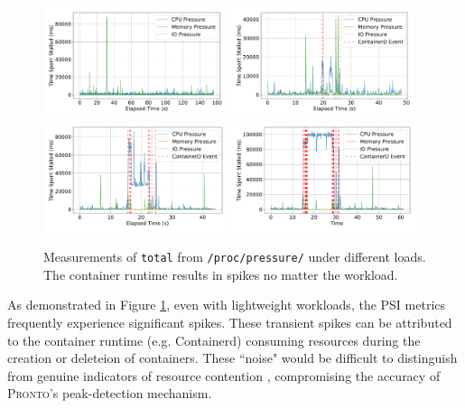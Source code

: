 \begin{figure}[ht]
    \centering
    \includegraphics[width=0.48\textwidth]{images/pressure-baseline.pdf}
    \includegraphics[width=0.48\textwidth]{images/pressure-single.pdf} \\
    \includegraphics[width=0.48\textwidth]{images/pressure-smallbatch.pdf}
    \includegraphics[width=0.48\textwidth]{images/pressure-bigbatch.pdf}
    \caption{Measurements of \texttt{total} from \texttt{/proc/pressure/} under
    different loads. The container runtime results in spikes no matter the
    workload.}
    \label{fig:pressure}
\end{figure}

As demonstrated in Figure \ref{fig:pressure}, even with lightweight workloads,
the PSI metrics frequently experience significant spikes. These transient spikes
can be attributed to the container runtime (e.g. Containerd) consuming resources
during the creation or deleteion of containers. These ``noise" would be
difficult to distinguish from genuine indicators of resource contention ,
compromising the accuracy of \textsc{Pronto}'s peak-detection mechanism.


